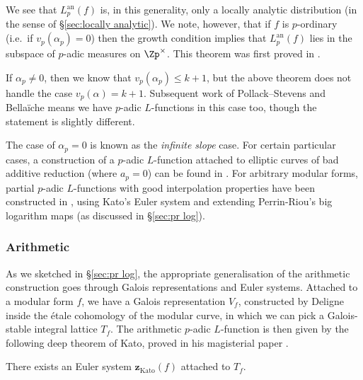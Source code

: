 \documentclass[a4paper,10pt, english, reqno]{smfart}
\numberwithin{equation}{section}
\begin{document}
We see that $L_p^{\mathrm{an}}(f)$ is, in this generality, only a locally analytic distribution (in the sense of \S\ref{sec:locally analytic}). We note, however, that if $f$ is $p$-ordinary (i.e.\ if $v_p(\alpha_p) = 0$) then the growth condition implies that $L_p^{\mathrm{an}}(f)$ lies in the subspace of $p$-adic measures on $\Zp^\times$. This theorem was first proved in \cite{MSD74, AV75, Vis76}.


If $\alpha_p \neq 0$, then we know that $v_p(\alpha_p) \leq k+1$, but the above theorem does not handle the case $v_p(\alpha) = k+1$. Subsequent work of Pollack--Stevens \cite{PS12} and Bella\"iche \cite{Bel12} means we have $p$-adic $L$-functions in this case too, though the statement is slightly different.

The case of $\alpha_p = 0$ is known as the \emph{infinite slope} case. For certain particular cases, a construction of a $p$-adic $L$-function attached to elliptic curves of bad additive reduction (where $a_p = 0$) can be found in \cite{Delbourgo}. For arbitrary modular forms, partial $p$-adic $L$-functions with good interpolation properties have been constructed in \cite{RodriguesPhiGamma}, using Kato's Euler system and extending Perrin-Riou's big logarithm maps (as discussed in \S \ref{sec:pr log}).


\subsubsection{Arithmetic}
As we sketched in \S\ref{sec:pr log}, the appropriate generalisation of the arithmetic construction goes through Galois representations and Euler systems. Attached to a modular form $f$, we have a Galois representation $V_f$, constructed by Deligne inside the \'etale cohomology of the modular curve, in which we can pick a Galois-stable integral lattice $T_f$. The arithmetic $p$-adic $L$-function is then given by the following deep theorem of Kato, proved in his magisterial paper \cite{Kat04}.

\begin{theorem}[Kato]
	There exists an Euler system $\mathbf{z}_{\mathrm{Kato}}(f)$ attached to $T_f$.
\end{theorem} 
\end{document}
